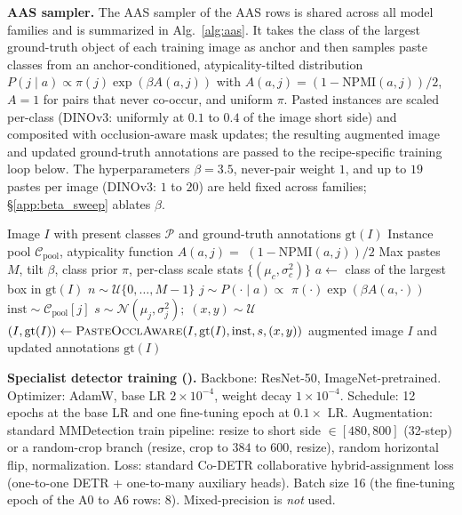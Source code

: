 \noindent\textbf{AAS sampler.}
The AAS sampler of the AAS rows is shared
across all model families and is summarized in
Alg.~\ref{alg:aas}.
It takes the class of the largest ground-truth object of each training image as anchor and then samples paste classes from
an anchor-conditioned, atypicality-tilted distribution
$P(j \mid a) \propto \pi(j)\exp(\beta A(a, j))$ with
$A(a, j) = (1 - \text{NPMI}(a, j))/2$, $A = 1$ for pairs that never co-occur, and uniform $\pi$. Pasted instances are scaled per-class (DINOv3: uniformly at $0.1$ to $0.4$ of the image short side) and composited with occlusion-aware mask updates; the resulting augmented image and updated ground-truth annotations are passed to the recipe-specific training loop below. The hyperparameters $\beta = 3.5$, never-pair weight $1$, and up to $19$ pastes per image (DINOv3: $1$ to $20$) are held fixed across families; \S\ref{app:beta_sweep} ablates $\beta$.

\begin{algorithm}[h]
\caption{Anchor-Atypicality Sampling (AAS)}
\label{alg:aas}
\small
\begin{algorithmic}[1]
\Require Image $I$ with present classes $\mathcal{P}$ and ground-truth annotations $\text{gt}(I)$
\Require Instance pool $\mathcal{C}_{\text{pool}}$, atypicality function $A(a,j) =$ $(1 - \text{NPMI}(a,j))/2$
\Require Max pastes $M$, tilt $\beta$, class prior $\pi$, per-class scale stats $\{(\mu_c, \sigma_c^2)\}$
\State $a \gets$ class of the largest box in $\text{gt}(I)$ 
\State $n \sim \mathcal{U}\{0, \ldots, M-1\}$ 
  \State $j \sim P(\cdot \mid a) \propto$ $\pi(\cdot) \exp(\beta A(a, \cdot))$ 
  \State $\text{inst} \sim \mathcal{C}_{\text{pool}}[j]$ 
  \State $s \sim \mathcal{N}(\mu_j, \sigma_j^2);\; (x, y) \sim \mathcal{U}$ 
  \State $(I, \text{gt}(I)) \gets \textsc{PasteOcclAware}(I, \text{gt}(I), \text{inst}, s, (x, y))$
\EndFor
\State \Return augmented image $I$ and updated annotations $\text{gt}(I)$
\end{algorithmic}
\end{algorithm}

\noindent\textbf{Specialist detector training (\codino{}).} Backbone: ResNet-50, ImageNet-pretrained. Optimizer: AdamW, base LR $2{\times}10^{-4}$, weight decay $1{\times}10^{-4}$. Schedule: 12 epochs at the base LR and one fine-tuning epoch at $0.1\times$ LR. Augmentation: standard MMDetection train pipeline: resize to short side $\in [480, 800]$ (32-step) or a random-crop branch (resize, crop to $384$ to $600$, resize), random horizontal flip, normalization. Loss: standard Co-DETR collaborative hybrid-assignment loss (one-to-one DETR + one-to-many auxiliary heads). Batch size 16 (the fine-tuning epoch of the A0 to A6 rows: 8). Mixed-precision is \emph{not} used.

